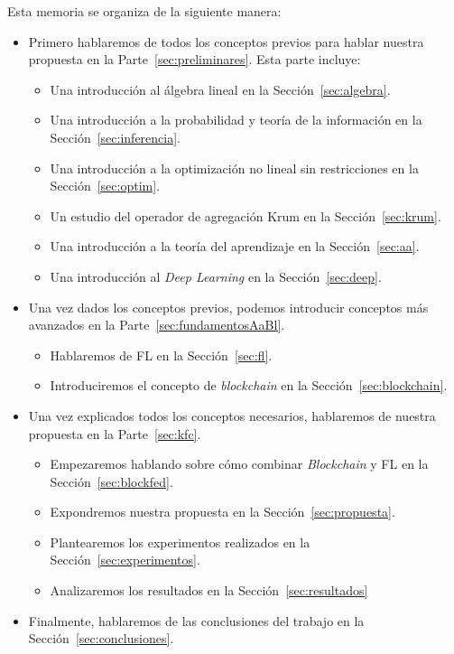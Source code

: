 Esta memoria se organiza de la siguiente manera:
\begin{itemize}
    \item Primero hablaremos de todos los conceptos previos para hablar nuestra propuesta en la Parte~\ref{sec:preliminares}. Esta parte incluye:
    \begin{itemize}
        \item Una introducción al álgebra lineal en la Sección~\ref{sec:algebra}.
        \item Una introducción a la probabilidad y teoría de la información en la Sección~\ref{sec:inferencia}.
        \item Una introducción a la optimización no lineal sin restricciones en la Sección~\ref{sec:optim}.
        \item Un estudio del operador de agregación Krum en la Sección~\ref{sec:krum}.
        \item Una introducción a la teoría del aprendizaje en la Sección~\ref{sec:aa}.
        \item Una introducción al \textit{Deep Learning} en la Sección~\ref{sec:deep}.
    \end{itemize}
    \item Una vez dados los conceptos previos, podemos introducir conceptos más avanzados en la Parte~\ref{sec:fundamentosAaBl}.
    \begin{itemize}
        \item Hablaremos de \ac{FL} en la Sección~\ref{sec:fl}.
        \item Introduciremos el concepto de \textit{blockchain} en la Sección~\ref{sec:blockchain}.
    \end{itemize}
    \item Una vez explicados todos los conceptos necesarios, hablaremos de nuestra propuesta en la Parte~\ref{sec:kfc}.
    \begin{itemize}
        \item Empezaremos hablando sobre cómo combinar \textit{Blockchain} y \ac{FL} en la Sección~\ref{sec:blockfed}.
        \item Expondremos nuestra propuesta en la Sección~\ref{sec:propuesta}.
        \item Plantearemos los experimentos realizados en la Sección~\ref{sec:experimentos}.
        \item Analizaremos los resultados en la Sección~\ref{sec:resultados}
    \end{itemize}
    \item Finalmente, hablaremos de las conclusiones del trabajo en la Sección~\ref{sec:conclusiones}.
\end{itemize}

